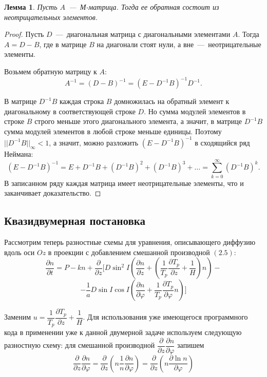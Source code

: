 \documentclass[14pt, a4paper, fleqn]{extarticle}
\newtheorem{Lemma}{Лемма}
\begin{document}
\begin{Lemma} Пусть $A$~---~М-матрица. Тогда ее обратная состоит из неотрицательных элементов.\end{Lemma}

\begin{proof} Пусть $D$~---~диагональная матрица с диагональными элементами $A$. Тогда $A=D-B$, где в матрице $B$ на диагонали стоят нули, а вне~---~неотрицательные элементы.

Возьмем обратную матрицу к $A$: $$A^{-1}=(D-B)^{-1}=(E-D^{-1}B)^{-1}D^{-1}.$$

В матрице $D^{-1}B$ каждая строка $B$ домножилась на обратный элемент к диагональному в соответствующей строке $D$. Но сумма модулей элементов в строке $B$ строго меньше этого диагонального элемента, а значит, в матрице $D^{-1}B$ сумма модулей элементов в любой строке меньше единицы. Поэтому $||D^{-1}B||_\infty<1$, а значит, можно разложить $(E-D^{-1}B)^{-1}$ в сходящийся ряд Неймана: $$(E-D^{-1}B)^{-1} = E+D^{-1}B + (D^{-1}B)^2+(D^{-1}B)^3+\dots =\displaystyle\sum_{k=0}^\infty (D^{-1}B)^k.$$
В записанном ряду каждая матрица имеет неотрицательные элементы, что и заканчивает доказательство. \end{proof}


\subsection{Квазидвумерная постановка}

Рассмотрим теперь разностные схемы для уравнения, описывающего диффузию вдоль оси $Oz$ в проекции с добавлением смешанной производной $(2.5)$:$$\dfrac{\partial n}{\partial t} =P-kn+\dfrac{\partial}{\partial z}\biggl[D\sin^2 I\left(\dfrac{\partial n}{\partial z}+\left(\dfrac{1}{T_p}\dfrac{\partial T_p}{\partial z}+\dfrac{1}{H}\right)n\right)-$$ $$-\dfrac{1}{a}D\sin I\cos I\left(\dfrac{\partial n}{\partial\varphi}+\dfrac{1}{T_p}\dfrac{\partial T_p}{\partial\varphi}n\right)\biggr]$$

Заменим $u = \dfrac{1}{T_p}\dfrac{\partial T_p}{\partial z}+\dfrac{1}{H}$. Для использования уже имеющегося программного кода в применении уже к данной двумерной задаче используем следующую разностную схему: для смешанной производной $\dfrac{\partial}{\partial z}\dfrac{\partial n}{\partial \varphi}$ запишем $$\dfrac{\partial}{\partial z}\dfrac{\partial n}{\partial \varphi}=\dfrac{\partial}{\partial z}\left(n\dfrac{1}{n}\dfrac{\partial n}{\partial \varphi}\right) = \dfrac{\partial}{\partial z}\left(n\dfrac{\partial \ln n}{\partial \varphi}\right)$$
\end{document}
